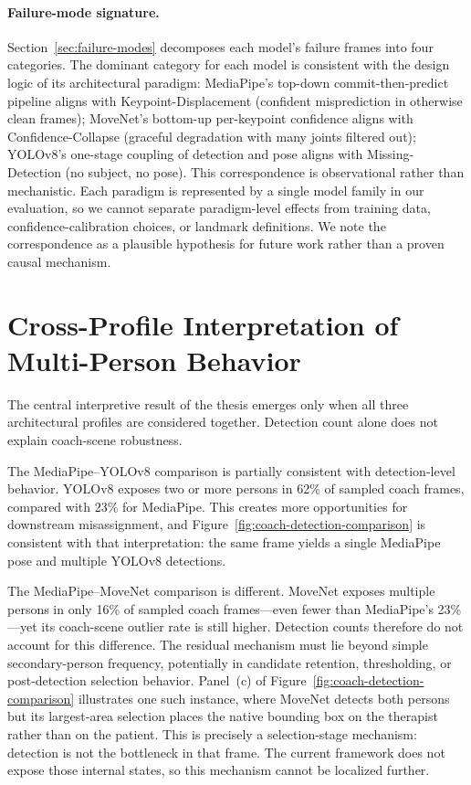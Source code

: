 \paragraph{Failure-mode signature.}
Section~\ref{sec:failure-modes} decomposes each model's failure frames into four categories. The dominant category for each model is consistent with the design logic of its architectural paradigm: MediaPipe's top-down commit-then-predict pipeline aligns with Keypoint-Displacement (confident misprediction in otherwise clean frames); MoveNet's bottom-up per-keypoint confidence aligns with Confidence-Collapse (graceful degradation with many joints filtered out); YOLOv8's one-stage coupling of detection and pose aligns with Missing-Detection (no subject, no pose). This correspondence is observational rather than mechanistic. Each paradigm is represented by a single model family in our evaluation, so we cannot separate paradigm-level effects from training data, confidence-calibration choices, or landmark definitions. We note the correspondence as a plausible hypothesis for future work rather than a proven causal mechanism.


\section{Cross-Profile Interpretation of Multi-Person Behavior}
\label{sec:selection-discussion}

The central interpretive result of the thesis emerges only when all three architectural profiles are considered together. Detection count alone does not explain coach-scene robustness.

The MediaPipe--YOLOv8 comparison is partially consistent with detection-level behavior. YOLOv8 exposes two or more persons in 62\% of sampled coach frames, compared with 23\% for MediaPipe. This creates more opportunities for downstream misassignment, and Figure~\ref{fig:coach-detection-comparison} is consistent with that interpretation: the same frame yields a single MediaPipe pose and multiple YOLOv8 detections.

The MediaPipe--MoveNet comparison is different. MoveNet exposes multiple persons in only 16\% of sampled coach frames---even fewer than MediaPipe's 23\%---yet its coach-scene outlier rate is still higher. Detection counts therefore do not account for this difference. The residual mechanism must lie beyond simple secondary-person frequency, potentially in candidate retention, thresholding, or post-detection selection behavior. Panel~(c) of Figure~\ref{fig:coach-detection-comparison} illustrates one such instance, where MoveNet detects both persons but its largest-area selection places the native bounding box on the therapist rather than on the patient. This is precisely a selection-stage mechanism: detection is not the bottleneck in that frame. The current framework does not expose those internal states, so this mechanism cannot be localized further.

